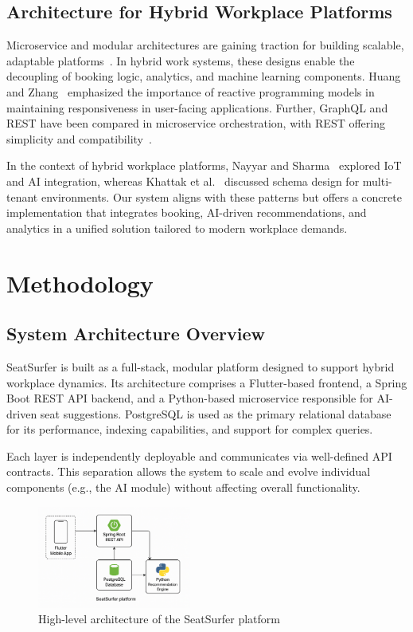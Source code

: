 \documentclass[conference]{IEEEtran}
\begin{document}
\subsection{Architecture for Hybrid Workplace Platforms}

Microservice and modular architectures are gaining traction for building scalable, adaptable platforms~\cite{torres2023micro}. In hybrid work systems, these designs enable the decoupling of booking logic, analytics, and machine learning components. Huang and Zhang~\cite{huang2023reactive} emphasized the importance of reactive programming models in maintaining responsiveness in user-facing applications. Further, GraphQL and REST have been compared in microservice orchestration, with REST offering simplicity and compatibility~\cite{wang2022graphql}.

In the context of hybrid workplace platforms, Nayyar and Sharma~\cite{nayyar2021smart} explored IoT and AI integration, whereas Khattak et al.~\cite{khattak2021schemas} discussed schema design for multi-tenant environments. Our system aligns with these patterns but offers a concrete implementation that integrates booking, AI-driven recommendations, and analytics in a unified solution tailored to modern workplace demands.

\section{Methodology}

\subsection{System Architecture Overview}

SeatSurfer is built as a full-stack, modular platform designed to support hybrid workplace dynamics. Its architecture comprises a Flutter-based frontend, a Spring Boot REST API backend, and a Python-based microservice responsible for AI-driven seat suggestions. PostgreSQL is used as the primary relational database for its performance, indexing capabilities, and support for complex queries.

Each layer is independently deployable and communicates via well-defined API contracts. This separation allows the system to scale and evolve individual components (e.g., the AI module) without affecting overall functionality.

\begin{figure}[!ht]
\centering
\includegraphics[width=0.45\textwidth]{architecture_diagram.png}
\caption{High-level architecture of the SeatSurfer platform}
\label{fig:architecture}
\end{figure}
\end{document}
